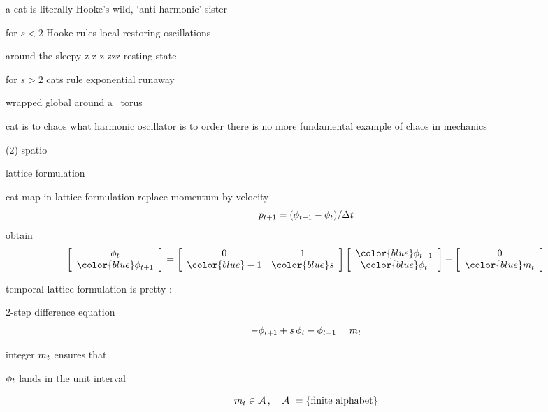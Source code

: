 \begin{frame}{a cat is literally Hooke's wild, `anti-harmonic' sister}

\begin{block}{for $s<2$ Hooke rules}
local restoring oscillations

around the sleepy z-z-z-zzz resting state
\end{block}

\begin{block}{for $s>2$ cats rule}
exponential runaway

wrapped global around a \statesp\ torus
\end{block}
\bigskip

\hfill
{\color{red}cat} is to {\color{red}chaos}
what {\color{red}harmonic oscillator} is to {\color{red}order}
\vfill
\hfill
{\color{blue}there is no more fundamental example of chaos in mechanics}
\end{frame} %

\begin{frame}{(2) {\color{orange}spatio}{\templatt}}
\vfill
\begin{center}
{\huge lattice formulation}
\end{center}
\vfill
\end{frame} %

\begin{frame}{cat map in lattice formulation}
replace momentum by velocity
\[
p_{t+1}=(\phi_{t+1}  - \phi_{t})/\Delta t
\]
obtain
 \[
 \left[\begin{array}{c}
   \ssp_{\zeit}  \\
   {\color{blue}\ssp_{\zeit+1}}
  \end{array} \right]=
  \left[
\begin{array}{cc}
0 & 1 \\
{\color{blue}-1} & {\color{blue}s} \\
\end{array}
    \right]
    \left[\begin{array}{c}
   {\color{blue}\ssp_{\zeit-1}}  \\
   {\color{blue}\ssp_{\zeit}}
  \end{array} \right]
 - \left[\begin{array}{c}
 0  \\
 {\color{blue}\Ssym{\zeit}}
 \end{array} \right]
 \] %

temporal lattice formulation %
is {\Large pretty} :
\begin{block}{2-step difference equation}
\[
- \phi_{t+1}  +  s \, \phi_{t} - \phi_{t-1} = {m_{t}}
\] %
\end{block}
integer ${m_{t}}$ ensures that

\hfill $\phi_{t}$ lands in the unit interval

\bigskip
\[
{m_{t}}\in  \mathcal{A}
\,,\quad \mathcal{A}\ = \{\mbox{finite alphabet}\}
\]
\end{frame} %

